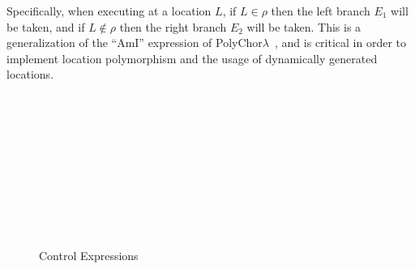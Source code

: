 Specifically, when executing at a location $L$, if $L \in \rho$ then the left branch $E_1$ will be taken, and if $L \notin \rho$ then the right branch $E_2$ will be taken.
This is a generalization of the ``AmI'' expression of PolyChor$\lambda$~\citep{GraversenHM23}, and is critical in order to implement location polymorphism and the usage of dynamically generated locations.

\begin{figure}
  \begin{syntax}
     \alternative{\CtrlFail}   \\
      \\
      \\
     \alternative{\RecvFrom{\ell}} \\
     \\
     \\
     \\
    \\
    \\

    \alternative{\CtrlFail}  


    \abstractCategory[Systems]{\Pi}
  \end{syntax}

  \caption{Control Expressions}
  \label{fig:control-lang-syntax}
\end{figure}

